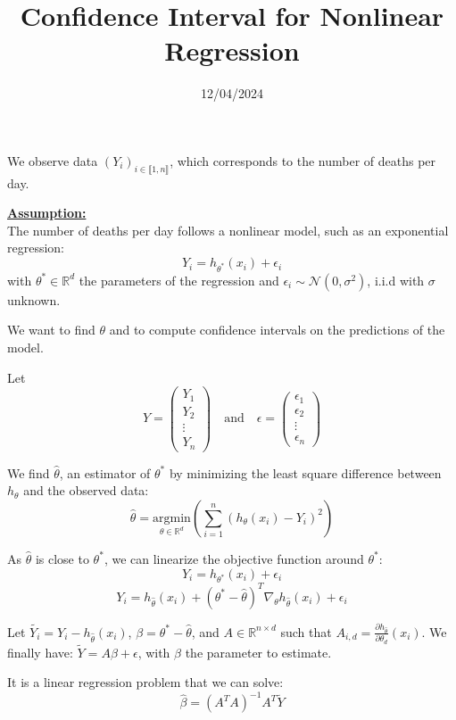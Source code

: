 \documentclass{article}
\title{Confidence Interval for Nonlinear Regression}
\author{}
\date{12/04/2024}
\begin{document}
\maketitle

We observe data $(Y_i)_{i \in \llbracket 1, n \rrbracket}$, which corresponds to the number of deaths per day.

\underline{\textbf{Assumption:}}\\
The number of deaths per day follows a nonlinear model, such as an exponential regression:
\[ Y_i = h_{\theta^*}(x_i) + \epsilon_i \]
with $\theta^* \in \mathbb{R}^d$ the parameters of the regression and $\epsilon_i \sim \mathcal{N}(0, \sigma^2)$, i.i.d with $\sigma$ unknown.

We want to find $\theta$ and to compute confidence intervals on the predictions of the model.

Let
\[ Y = 
\begin{pmatrix}
    Y_1 \\
    Y_2 \\
    \vdots \\
    Y_n
\end{pmatrix} 
\quad \text{and} \quad
\epsilon = 
\begin{pmatrix}
    \epsilon_1 \\
    \epsilon_2 \\
    \vdots \\
    \epsilon_n
\end{pmatrix} \]

We find $\hat{\theta}$, an estimator of $\theta^*$ by minimizing the least square difference between $h_\theta$ and the observed data:
\[ \hat{\theta} = \underset{\theta \in \mathbb{R}^d}{\text{argmin}} \left(\sum_{i=1}^{n} (h_{\theta}(x_i) - Y_i)^2\right) \]

As $\hat{\theta}$ is close to $\theta^*$, we can linearize the objective function around $\theta^*$:
\[ Y_i = h_{\theta^*}(x_i) + \epsilon_i \]
\[ Y_i = h_{\hat{\theta}}(x_i) + (\theta^* - \hat{\theta})^T \nabla_{\theta}h_{\hat{\theta}}(x_i) + \epsilon_i \]

Let $\tilde{Y_i} = Y_i - h_{\hat{\theta}}(x_i)$, $\beta = \theta^* - \hat{\theta}$, and $A \in \mathbb{R}^{n \times d}$ such that $A_{i,d} = \frac{\partial h_{\hat{\theta}}}{\partial \theta_d}(x_i)$. We finally have: $\tilde{Y} = A \beta + \epsilon$, with $\beta$ the parameter to estimate.

It is a linear regression problem that we can solve:
\[ \hat{\beta} = (A^T A)^{-1} A^T \tilde{Y} \]
\end{document}
